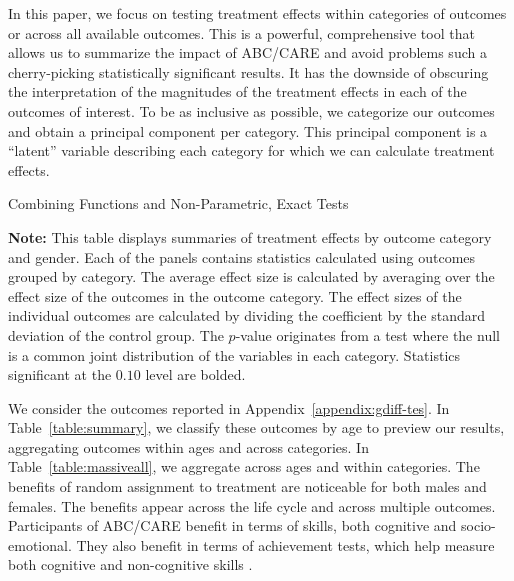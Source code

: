 In this paper, we focus on testing treatment effects within categories of outcomes or across all available outcomes. This is a powerful, comprehensive tool that allows us to summarize the impact of ABC/CARE and avoid problems such a cherry-picking statistically significant results. It has the downside of obscuring the interpretation of the magnitudes of the treatment effects in each of the outcomes of interest. To be as inclusive as possible, we categorize our outcomes and obtain a principal component per category. This principal component is a ``latent'' variable describing each category for which we can calculate treatment effects.

\begin{table}[!htpb]
\begin{threeparttable}
\caption{Combining Functions and Non-Parametric, Exact Tests} \label{table:massiveall}
\centering
 
\begin{tablenotes}
\footnotesize
\item \textbf{Note:} This table displays summaries of treatment effects by outcome category and gender. Each of the panels contains statistics calculated using outcomes grouped by category. The average effect size is calculated by averaging over the effect size of the outcomes in the outcome category. The effect sizes of the individual outcomes are calculated by dividing the coefficient by the standard deviation of the control group.  The \citet{Rosenbaum_2005_Distribution_JRSS} $p$-value originates from a test where the null is a common joint distribution of the variables in each category. Statistics significant at the $0.10$ level are bolded.
\end{tablenotes}
\end{threeparttable}
\end{table}

We consider the outcomes reported in Appendix~\ref{appendix:gdiff-tes}. In Table~\ref{table:summary}, we classify these outcomes by age to preview our results, aggregating outcomes within ages and across categories. In Table~\ref{table:massiveall}, we aggregate across ages and within categories. The benefits of random assignment to treatment are noticeable for both males and females. The benefits appear across the life cycle and across multiple outcomes. Participants of ABC/CARE benefit in terms of skills, both cognitive and socio-emotional. They also benefit in terms of achievement tests, which help measure both cognitive and non-cognitive skills \citep{Almlund_Duckworth_etal_2011_ecoval}.

